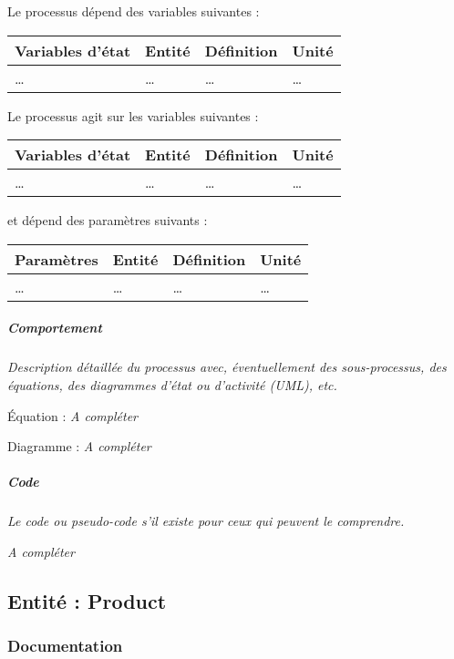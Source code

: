 \documentclass[
]{article}
\begin{document}
Le processus dépend des variables suivantes :

\begin{longtable}[]{@{}llll@{}}
\toprule\noalign{}
\textbf{Variables d'état} & \textbf{Entité} & \textbf{Définition} &
\textbf{Unité} \\
\midrule\noalign{}
\endhead
\bottomrule\noalign{}
\endlastfoot
\ldots{} & \ldots{} & \ldots{} & \ldots{} \\
\end{longtable}

Le processus agit sur les variables suivantes :

\begin{longtable}[]{@{}llll@{}}
\toprule\noalign{}
\textbf{Variables d'état} & \textbf{Entité} & \textbf{Définition} &
\textbf{Unité} \\
\midrule\noalign{}
\endhead
\bottomrule\noalign{}
\endlastfoot
\ldots{} & \ldots{} & \ldots{} & \ldots{} \\
\end{longtable}

et dépend des paramètres suivants :

\begin{longtable}[]{@{}llll@{}}
\toprule\noalign{}
\textbf{Paramètres} & \textbf{Entité} & \textbf{Définition} &
\textbf{Unité} \\
\midrule\noalign{}
\endhead
\bottomrule\noalign{}
\endlastfoot
\ldots{} & \ldots{} & \ldots{} & \ldots{} \\
\end{longtable}

\subparagraph{Comportement}\label{comportement-3}

\emph{Description détaillée du processus avec, éventuellement des
sous-processus, des équations, des diagrammes d'état ou d'activité
(UML), etc.}

Équation : \emph{A compléter}

Diagramme : \emph{A compléter}

\subparagraph{Code}\label{code-3}

\emph{Le code ou pseudo-code s'il existe pour ceux qui peuvent le
comprendre.}

\emph{A compléter}

\subsection{Entité : Product}\label{entituxe9-product}

\subsubsection{Documentation}\label{documentation-10}
\end{document}
